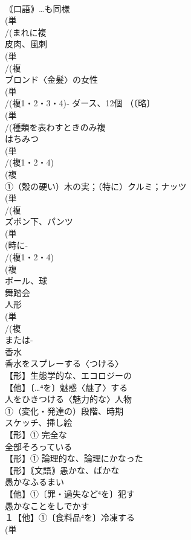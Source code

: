 \documentclass[8pt]{extreport}
\begin{document}
\begin{CJK}{UTF8}{min}
\\	｟口語｠…も同様
\\	(単
\\	/(まれに複
\\	皮肉、風刺 
\\	(単
\\	/(複
\\	ブロンド〈金髪〉の女性 
\\	(単
\\	/(複1・2・3・4)‐ ダース、12個 （〔略〕
\\	(単
\\	/(種類を表わすときのみ複
\\	はちみつ 
\\	(単
\\	/(複1・2・4)
\\	(複
\\	①（殻の硬い）木の実；（特に）クルミ；ナッツ 
\\	(単
\\	/(複
\\	ズボン下、パンツ 
\\	(単
\\	(時に-
\\	/(複1・2・4)
\\	(複
\\	ボール、球 
\\	舞踏会 
\\	人形
\\	(単
\\	/(複
\\	または-
\\	香水 
\\	香水をスプレーする〈つける〉
\\	【形】生態学的な、エコロジーの 
\\	【他】〔…⁴を〕魅惑〈魅了〉する 
\\	人をひきつける〈魅力的な〉人物
\\	①（変化・発達の）段階、時期
\\	スケッチ、挿し絵 
\\	【形】① 完全な　
\\	全部そろっている 
\\	【形】① 論理的な、論理にかなった 
\\	【形】｟文語｠愚かな、ばかな 
\\	愚かなふるまい 
\\	【他】①〔罪・過失など⁴を〕犯す 
\\	愚かなことをしでかす
\\	１【他】①〔食料品⁴を〕冷凍する 
\\	(単

\end{CJK}
\end{document}
